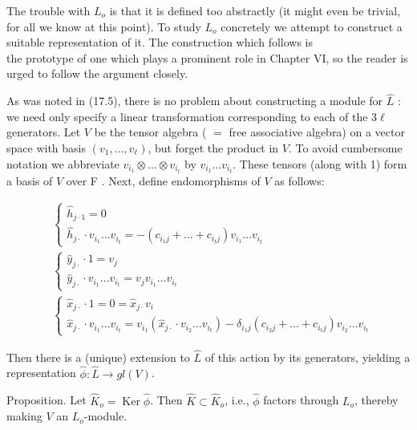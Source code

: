 \documentclass[10pt]{article}
\begin{document}
The trouble with $L_{o}$ is that it is defined too abstractly (it might even be trivial, for all we know at this point). To study $L_{o}$ concretely we attempt to construct a suitable representation of it. The construction which follows is\\
the prototype of one which plays a prominent role in Chapter VI, so the reader is urged to follow the argument closely.

As was noted in (17.5), there is no problem about constructing a module for $\hat{L}$ : we need only specify a linear transformation corresponding to each of the $3 \ell$ generators. Let $V$ be the tensor algebra ( $=$ free associative algebra) on a vector space with basis $\left(v_{1}, \ldots, v_{\ell}\right)$, but forget the product in $V$. To avoid cumbersome notation we abbreviate $v_{i_{1}} \otimes \ldots \otimes v_{i_{t}}$ by $v_{i_{1}} \ldots v_{i_{t}}$. These tensors (along with 1) form a basis of $V$ over F . Next, define endomorphisms of $V$ as follows:

$$
\begin{aligned}
& \left\{\begin{array}{l}
\hat{h}_{j \cdot 1}=0 \\
\hat{h}_{j \cdot} \cdot v_{i_{1}} \ldots v_{i_{t}}=-\left(c_{i_{1} j}+\ldots+c_{i_{t} j}\right) v_{i_{1}} \ldots v_{i_{t}}
\end{array}\right. \\
& \left\{\begin{array}{l}
\hat{y}_{j \cdot} \cdot 1=v_{j} \\
\hat{y}_{j \cdot} \cdot v_{i_{1}} \ldots v_{i_{t}}=v_{j} v_{i_{1}} \ldots v_{i_{t}}
\end{array}\right. \\
& \left\{\begin{array}{l}
\hat{x}_{j \cdot} \cdot 1=0=\hat{x}_{j \cdot} v_{i} \\
\hat{x}_{j \cdot} \cdot v_{i_{1}} \ldots v_{i_{t}}=v_{i_{1}}\left(\hat{x}_{j \cdot} \cdot v_{i_{2}} \ldots v_{i_{t}}\right)-\delta_{i_{1} j}\left(c_{i_{2} j}+\ldots+c_{i_{t} j}\right) v_{i_{2}} \ldots v_{i_{t}}
\end{array}\right.
\end{aligned}
$$

Then there is a (unique) extension to $\hat{L}$ of this action by its generators, yielding a representation $\hat{\phi}: \hat{L} \rightarrow g l(V)$.

Proposition. Let $\hat{K}_{o}=\operatorname{Ker} \hat{\phi}$. Then $\hat{K} \subset \hat{K}_{o}$, i.e., $\hat{\phi}$ factors through $L_{o}$, thereby making $V$ an $L_{o}$-module.
\end{document}
